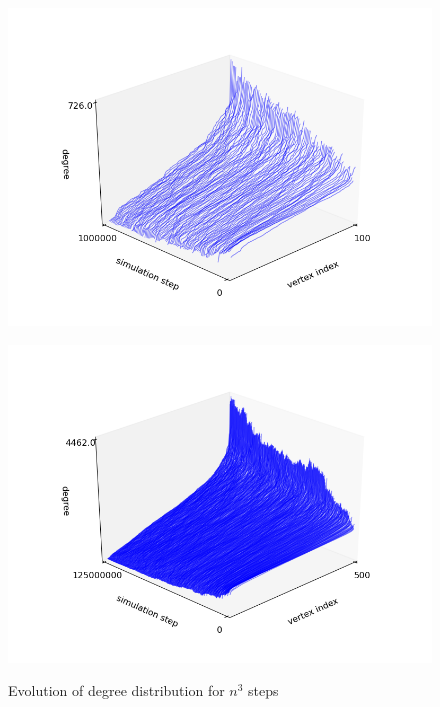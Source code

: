 \documentclass[11pt]{article}
\begin{document}
\begin{figure}[h]
  \begin{minipage}[c][11cm][t]{.9\textwidth}
    \centering
    \includegraphics[width=127mm]{degSurf100}
    \label{fig:degSurf100}\par\vfill
  \end{minipage}
  \begin{minipage}[c][11cm][t]{.9\textwidth}
    \centering
    \includegraphics[width=127mm]{degSurf500}
    \label{fig:degSurf500}
  \end{minipage}
  \caption{Evolution of degree distribution for $n^{3}$ steps}
\end{figure}
\vspace{10cm}
\end{document}
